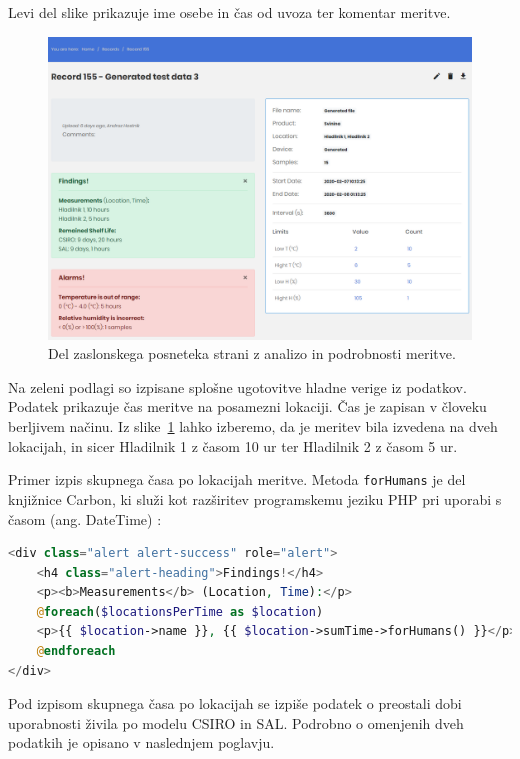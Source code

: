 \documentclass[a4paper, 12pt]{book}
\begin{document}
Levi del slike prikazuje ime osebe in čas od uvoza ter komentar meritve.

\begin{figure}[h]
\begin{center}
\includegraphics[width=\textwidth]{slike/record_page_11.png}
\end{center}
\caption{Del zaslonskega posneteka strani z analizo in podrobnosti meritve.}
\label{ss-record-page}
\end{figure}

Na zeleni podlagi so izpisane splošne ugotovitve hladne verige iz podatkov. Podatek  prikazuje čas meritve na posamezni lokaciji. Čas je zapisan v človeku berljivem načinu. Iz slike~\ref{ss-record-page} lahko izberemo, da je meritev bila izvedena na dveh lokacijah, in sicer Hladilnik 1 z časom 10 ur ter Hladilnik 2 z časom 5 ur. 

Primer izpis skupnega časa po lokacijah meritve. Metoda \verb=forHumans= je del knjižnice Carbon, ki služi kot razširitev programskemu jeziku PHP pri uporabi s časom (ang. DateTime) \cite{carbon-framework}:

\begin{lstlisting}[language=PHP, style=mystyle]
<div class="alert alert-success" role="alert">
    <h4 class="alert-heading">Findings!</h4>
    <p><b>Measurements</b> (Location, Time):</p>
    @foreach($locationsPerTime as $location)
    <p>{{ $location->name }}, {{ $location->sumTime->forHumans() }}</p>
    @endforeach
</div>
\end{lstlisting}

Pod izpisom skupnega časa po lokacijah se izpiše podatek o preostali dobi uporabnosti živila po modelu CSIRO in SAL. Podrobno o omenjenih dveh podatkih je opisano v naslednjem poglavju.
\end{document}
